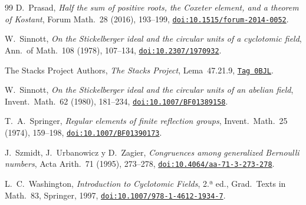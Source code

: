 \documentclass[11pt,a4paper]{article}
\theoremstyle{definition}
\begin{document}
\begin{thebibliography}{99}
 D.~Prasad, \emph{Half the sum of positive roots, the Coxeter element, and a theorem of Kostant}, Forum Math.~28 (2016), 193--199, \href{https://doi.org/10.1515/forum-2014-0052}{\texttt{doi:10.1515/forum-2014-0052}}.

 W.~Sinnott, \emph{On the Stickelberger ideal and the circular units of a cyclotomic field}, Ann.~of Math.~108 (1978), 107--134, \href{https://doi.org/10.2307/1970932}{\texttt{doi:10.2307/1970932}}.

 The Stacks Project Authors, \emph{The Stacks Project}, Lema~47.21.9, \href{https://stacks.math.columbia.edu/tag/0BJL}{\texttt{Tag 0BJL}}.

 W.~Sinnott, \emph{On the Stickelberger ideal and the circular units of an abelian field}, Invent.~Math.~62 (1980), 181--234, \href{https://doi.org/10.1007/BF01389158}{\texttt{doi:10.1007/BF01389158}}.

 T.~A.~Springer, \emph{Regular elements of finite reflection groups}, Invent.~Math.~25 (1974),
159--198, \href{https://doi.org/10.1007/BF01390173}{\texttt{doi:10.1007/BF01390173}}.

 J.~Szmidt, J.~Urbanowicz y D.~Zagier, \emph{Congruences among generalized Bernoulli numbers}, Acta Arith.~71 (1995), 273--278, \href{https://doi.org/10.4064/aa-71-3-273-278}{\texttt{doi:10.4064/aa-71-3-273-278}}.

 L.~C.~Washington, \emph{Introduction to Cyclotomic Fields}, 2.ª ed., Grad.~Texts in Math.~83, Springer, 1997, \href{https://doi.org/10.1007/978-1-4612-1934-7}{\texttt{doi:10.1007/978-1-4612-1934-7}}.

\end{thebibliography}
\end{document}
